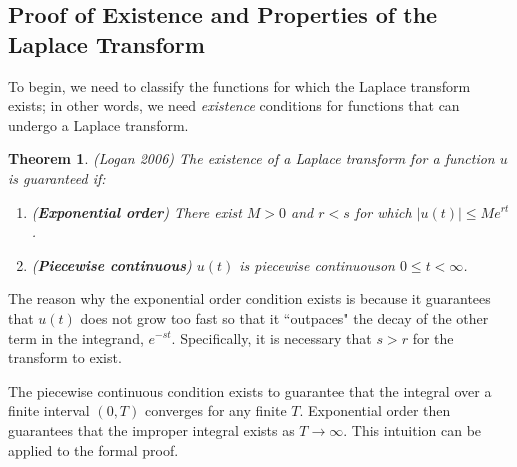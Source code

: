 \documentclass[12pt]{article}
\theoremstyle{plain}
\newtheorem{theorem}{Theorem}[section]
\theoremstyle{definition}
\begin{document}
\subsection{Proof of Existence and Properties of the Laplace Transform}
To begin, we need to classify the functions for which the Laplace transform exists; in other words, we need \emph{existence} conditions for functions that can undergo a Laplace transform.
\begin{theorem}
    (Logan 2006) The existence of a Laplace transform for a function $u$ is guaranteed if:
    \begin{enumerate}
        \item (\textbf{Exponential order}) There exist $M>0$ and $r<s$ for which $|u(t)|\leq Me^{rt}$.
        \item (\textbf{Piecewise continuous}) $u(t)$ is piecewise continuous\footnotemark on $0\leq t < \infty$.
    \end{enumerate}
\end{theorem}
The reason why the exponential order condition exists is because it guarantees that $u(t)$ does not grow too fast so that it ``outpaces" the decay of the other term in the integrand, $e^{-st}$. Specifically, it is necessary that $s>r$ for the transform to exist.

The piecewise continuous condition exists to guarantee that the integral over a finite interval $(0,T)$ converges for any finite $T$. Exponential order then guarantees that the improper integral exists as $T\to \infty$. This intuition can be applied to the formal proof.
\end{document}
